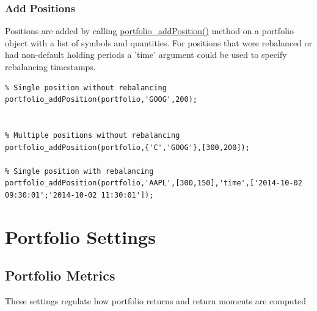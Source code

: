 \documentclass[letterpaper]{report}
\begin{document}
\subsection {Add Positions}
Positions are added by calling
\href{https://www.portfolioeffect.com/docs/platform/quant/functions/general-functions/portfolio-add-position}{portfolio\_addPosition()}
method on a portfolio object with a list of symbols and quantities. For
positions that were rebalanced or had non-default holding periods a 'time' argument could be used to specify rebalancing timestamps.
\begin{lstlisting}
% Single position without rebalancing
portfolio_addPosition(portfolio,'GOOG',200);


% Multiple positions without rebalancing
portfolio_addPosition(portfolio,{'C','GOOG'},[300,200]);

% Single position with rebalancing
portfolio_addPosition(portfolio,'AAPL',[300,150],'time',['2014-10-02 09:30:01';'2014-10-02 11:30:01']);
\end{lstlisting}


\chapter{Portfolio Settings}
\section{Portfolio Metrics}
These settings regulate how portfolio returns and return moments are computed
\end{document}
